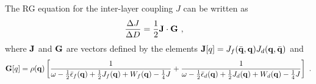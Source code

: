 \documentclass[%
reprint,
superscriptaddress,
groupedaddress,
superscriptaddress,
onecolumn,
10pt
]{revtex4-2}
\begin{document}
The RG equation for the inter-layer coupling \(J\) can be written as
\begin{equation}\begin{aligned}
	\frac{\Delta J}{\Delta D} &= \frac{1}{2} {\bf J} \cdot \mathcal{\bf G}~,
\end{aligned}\end{equation}
where \({\bf J}\) and \(\mathcal{\bf G}\) are vectors defined by the elements \({\bf J}[q] = J_f(\bar{\bf q},{\bf q}) J_d({\bf q},\bar{\bf q})\) and 
\begin{equation}\begin{aligned}
	\mathcal{\bf G}[q] = \rho({\bf q}) \left[\frac{1}{\omega - \frac{1}{2}\bar\epsilon_f({\bf q}) + \frac{1}{2}J_f({\bf q}) + W_f({\bf q}) - \frac{1}{4}J} + \frac{1}{\omega - \frac{1}{2}\bar\epsilon_d({\bf q}) + \frac{1}{2}J_d({\bf q}) + W_d({\bf q}) - \frac{1}{4}J}\right]~.
\end{aligned}\end{equation}
\end{document}
